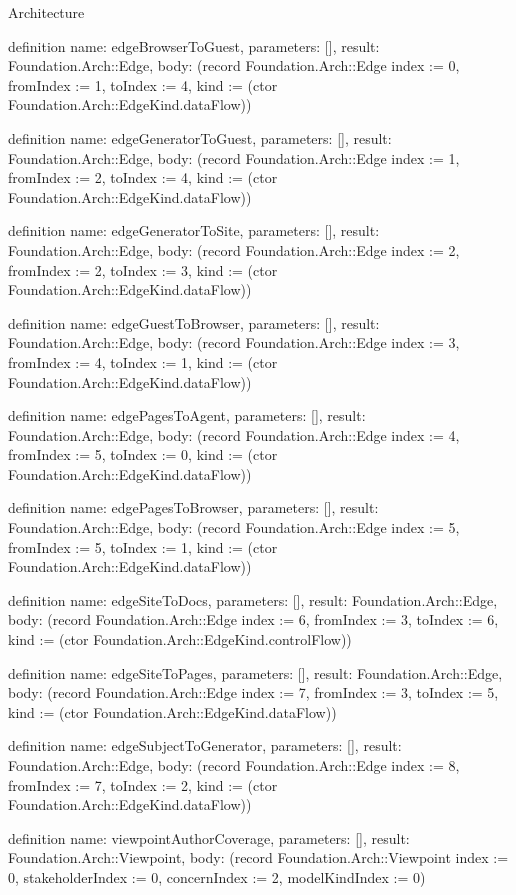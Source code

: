 \begin{lexlean}{Architecture}
\begin{semanticmodule}
definition{
  name: edgeBrowserToGuest,
  parameters: [],
  result: Foundation.Arch::Edge,
  body: (record Foundation.Arch::Edge {index := 0, fromIndex := 1, toIndex := 4, kind := (ctor Foundation.Arch::EdgeKind.dataFlow)})
}

definition{
  name: edgeGeneratorToGuest,
  parameters: [],
  result: Foundation.Arch::Edge,
  body: (record Foundation.Arch::Edge {index := 1, fromIndex := 2, toIndex := 4, kind := (ctor Foundation.Arch::EdgeKind.dataFlow)})
}

definition{
  name: edgeGeneratorToSite,
  parameters: [],
  result: Foundation.Arch::Edge,
  body: (record Foundation.Arch::Edge {index := 2, fromIndex := 2, toIndex := 3, kind := (ctor Foundation.Arch::EdgeKind.dataFlow)})
}

definition{
  name: edgeGuestToBrowser,
  parameters: [],
  result: Foundation.Arch::Edge,
  body: (record Foundation.Arch::Edge {index := 3, fromIndex := 4, toIndex := 1, kind := (ctor Foundation.Arch::EdgeKind.dataFlow)})
}

definition{
  name: edgePagesToAgent,
  parameters: [],
  result: Foundation.Arch::Edge,
  body: (record Foundation.Arch::Edge {index := 4, fromIndex := 5, toIndex := 0, kind := (ctor Foundation.Arch::EdgeKind.dataFlow)})
}

definition{
  name: edgePagesToBrowser,
  parameters: [],
  result: Foundation.Arch::Edge,
  body: (record Foundation.Arch::Edge {index := 5, fromIndex := 5, toIndex := 1, kind := (ctor Foundation.Arch::EdgeKind.dataFlow)})
}

definition{
  name: edgeSiteToDocs,
  parameters: [],
  result: Foundation.Arch::Edge,
  body: (record Foundation.Arch::Edge {index := 6, fromIndex := 3, toIndex := 6, kind := (ctor Foundation.Arch::EdgeKind.controlFlow)})
}

definition{
  name: edgeSiteToPages,
  parameters: [],
  result: Foundation.Arch::Edge,
  body: (record Foundation.Arch::Edge {index := 7, fromIndex := 3, toIndex := 5, kind := (ctor Foundation.Arch::EdgeKind.dataFlow)})
}

definition{
  name: edgeSubjectToGenerator,
  parameters: [],
  result: Foundation.Arch::Edge,
  body: (record Foundation.Arch::Edge {index := 8, fromIndex := 7, toIndex := 2, kind := (ctor Foundation.Arch::EdgeKind.dataFlow)})
}

definition{
  name: viewpointAuthorCoverage,
  parameters: [],
  result: Foundation.Arch::Viewpoint,
  body: (record Foundation.Arch::Viewpoint {index := 0, stakeholderIndex := 0, concernIndex := 2, modelKindIndex := 0})
}


\end{semanticmodule}
\end{lexlean}
